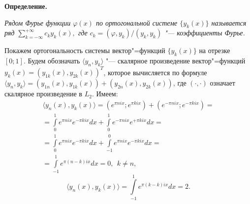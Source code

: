 {\bf Определение. } {\it Рядом Фурье функции ${\varphi (x)}$ по
ортогональной системе $\{y_{k}(x)\}$ называется ряд
$\sum\limits_{k=-\infty}^{+\infty}c_{k} y_{k}(x),$ где
$c_k=(\varphi,y_{k})/(y_{k},y_{k})$ "--- коэффициенты Фурье.

}

Покажем    ортогональность системы вектор"=функций $\{y_{k}(x)\} $ на
отрезке~$[0;1]$. Будем обозначать $\langle y_n,y_k\rangle$
"--- скалярное произведение   вектор"=функций
$y_{k}(x)=(y_{1k}(x),y_{2k}(x))^T$, которое вычисляется по формуле
\\
$\langle y_n,y_k \rangle
=(y_{1n}(x),y_{1k}(x))+(y_{2n}(x),y_{2k}(x))$, где $(\cdot,\cdot)$
означает скалярное произведение в $L_2$. Имеем:
\begin{multline*}
\langle y_{n}(x),y_{k}(x)\rangle=(e^{ \pi nix}; e^{ \pi
kix})+(e^{-\pi nix}; e^{- \pi kix}) = \\ = \int\limits^1_0{e^{ \pi
nix}e^{- \pi kix}}dx +\int\limits^1_0{e^{ -\pi nix}e^{+\pi kix}}dx =
\\ = \int\limits^1_0{e^{ \pi nix}e^{- \pi kix}}dx +\int\limits_{-1}^0{e^{
 \pi nix}e^{-\pi kix}}dx =
\\=
  \int\limits_{-1}^1  e^{ \pi (n-k)ix} dx = 0, \ \
  k \neq n,
\end{multline*}
$$
   \langle y_{n}(x),y_{k}(x)\rangle=\int\limits_{-1}^1   e^{ \pi (k-k)ix} dx = 2.
$$

